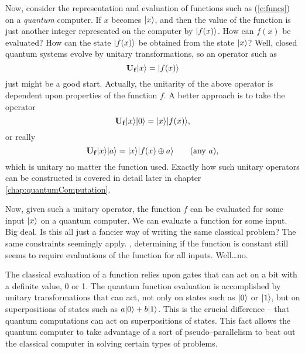 Now, consider the representation and evaluation of functions such as 
(\ref{e:funcs}) on a \emph{quantum} computer.
If $x$ becomes ${|{x}\rangle}$, and then the value of the function is just
another integer represented on the computer by ${|{f(x)}\rangle}$.
How can $f(x)$ be evaluated?  How can the state ${|{f(x)}\rangle}$ be
obtained from the state ${|{x}\rangle}$?  Well, closed quantum systems 
evolve by unitary transformations, so an operator such as
\begin{equation}
{\bf U_f}{|{x}\rangle} = {|{f(x)}\rangle}
\end{equation}
just might be a good start.
Actually, the unitarity of the above operator is dependent upon
properties of the function $f$.
A better approach is to take the operator
\begin{equation}
{\bf U_f}{|{x}\rangle}{|{0}\rangle} = {|{x}\rangle}{|{f(x)}\rangle},
\end{equation}
or really
\begin{equation}
{\bf U_f}{|{x}\rangle}{|{a}\rangle} = {|{x}\rangle}{|{f(x)\oplus a}\rangle}\qquad\text{(any $a$)},
\end{equation}
which is unitary no matter the function used.
Exactly how such unitary operators can be 
constructed is covered in detail later in 
chapter \ref{chap:quantumComputation}.

Now, given such a unitary operator, the function $f$ can be 
evaluated for some input ${|{x}\rangle}$ on a quantum computer.
We can evaluate a function for some input.
Big deal.  Is this all just a fancier way of writing the same
classical problem?  
The same constraints seemingly apply. \ie, determining if the
function is constant still seems to require evaluations of the
function for all inputs.  Well\dots no.

The classical evaluation of a function relies upon gates that
can act on a bit with a definite value, 0 or 1.  The quantum
function evaluation is accomplished by unitary transformations
that can act, not only on states such as ${|{0}\rangle}$ or
${|{1}\rangle}$, but on superpositions of states such as 
$a{|{0}\rangle}+b{|{1}\rangle}$.  This is the crucial difference -- that 
quantum computations can act on superpositions of states.  
This fact allows the quantum computer to take advantage of a 
sort of pseudo--parallelism to beat out the classical computer
in solving certain types of problems.

